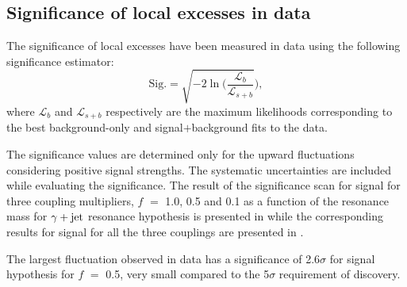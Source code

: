\subsection{Significance of local excesses in data}
The significance of local excesses have been measured in data using the following significance estimator: 
\begin{equation}
\textrm{Sig.} = \sqrt{-2 \ln\big(\frac{\mathcal{L}_{b}}{\mathcal{L}_{s+b}}}\big),
\end{equation}
where $\mathcal{L}_{b}$ and $\mathcal{L}_{s+b}$ respectively are the maximum likelihoods corresponding to the best background-only and signal$+$background
fits to the data.

The significance values are determined only for the upward fluctuations considering positive signal strengths. The systematic uncertainties
are included while evaluating the significance. The result of the significance scan for \qstar signal for three coupling multipliers, $f$ $=$ 1.0, 0.5 and 0.1 as a
function of the resonance mass for $\gamma+\mathrm{jet}$ resonance hypothesis is presented in \fig{\ref{fig:sig_q}} while the corresponding results for \bstar signal for all
the three couplings are presented in \fig{\ref{fig:sig_b}}.

The largest fluctuation observed in data has a significance of 2.6$\sigma$ for \bstar signal hypothesis for $f$ $=$ 0.5, very small compared to the 5$\sigma$
requirement of discovery.

